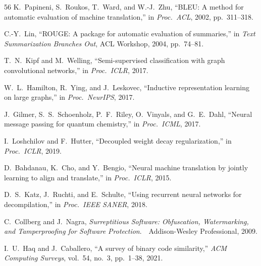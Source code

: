 \documentclass[sigconf,nonacm]{acmart}
\begin{document}
{\begin{thebibliography}{56}
K.~Papineni, S.~Roukos, T.~Ward, and W.-J.~Zhu, ``BLEU: A method for automatic evaluation of machine translation,'' in \emph{Proc.\ ACL}, 2002, pp.~311--318.

C.-Y.~Lin, ``ROUGE: A package for automatic evaluation of summaries,'' in \emph{Text Summarization Branches Out}, ACL Workshop, 2004, pp.~74--81.

T.~N.~Kipf and M.~Welling, ``Semi-supervised classification with graph convolutional networks,'' in \emph{Proc.\ ICLR}, 2017.

W.~L.~Hamilton, R.~Ying, and J.~Leskovec, ``Inductive representation learning on large graphs,'' in \emph{Proc.\ NeurIPS}, 2017.

J.~Gilmer, S.~S.~Schoenholz, P.~F.~Riley, O.~Vinyals, and G.~E.~Dahl, ``Neural message passing for quantum chemistry,'' in \emph{Proc.\ ICML}, 2017.

I.~Loshchilov and F.~Hutter, ``Decoupled weight decay regularization,'' in \emph{Proc.\ ICLR}, 2019.

D.~Bahdanau, K.~Cho, and Y.~Bengio, ``Neural machine translation by jointly learning to align and translate,'' in \emph{Proc.\ ICLR}, 2015.

D.~S.~Katz, J.~Ruchti, and E.~Schulte, ``Using recurrent neural networks for decompilation,'' in \emph{Proc.\ IEEE SANER}, 2018.

C.~Collberg and J.~Nagra, \emph{Surreptitious Software: Obfuscation, Watermarking, and Tamperproofing for Software Protection}.\ \ Addison-Wesley Professional, 2009.

I.~U.~Haq and J.~Caballero, ``A survey of binary code similarity,'' \emph{ACM Computing Surveys}, vol.~54, no.~3, pp.~1--38, 2021.

\end{thebibliography}
}
\end{document}
